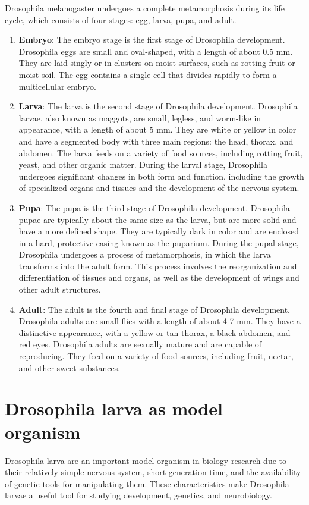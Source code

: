 \documentclass{book}
\begin{document}
	Drosophila melanogaster undergoes a complete metamorphosis during its life cycle, which consists of four stages: egg, larva, pupa, and adult.
	
	\begin{enumerate}
		\item \textbf{Embryo}: The embryo stage is the first stage of Drosophila development. Drosophila eggs are small and oval-shaped, with a length of about 0.5 mm. They are laid singly or in clusters on moist surfaces, such as rotting fruit or moist soil. The egg contains a single cell that divides rapidly to form a multicellular embryo.
		\item \textbf{Larva}: The larva is the second stage of Drosophila development. Drosophila larvae, also known as maggots, are small, legless, and worm-like in appearance, with a length of about 5 mm. They are white or yellow in color and have a segmented body with three main regions: the head, thorax, and abdomen. The larva feeds on a variety of food sources, including rotting fruit, yeast, and other organic matter. During the larval stage, Drosophila undergoes significant changes in both form and function, including the growth of specialized organs and tissues and the development of the nervous system.
		\item \textbf{Pupa}: The pupa is the third stage of Drosophila development. Drosophila pupae are typically about the same size as the larva, but are more solid and have a more defined shape. They are typically dark in color and are enclosed in a hard, protective casing known as the puparium. During the pupal stage, Drosophila undergoes a process of metamorphosis, in which the larva transforms into the adult form. This process involves the reorganization and differentiation of tissues and organs, as well as the development of wings and other adult structures.
		\item \textbf{Adult}: The adult is the fourth and final stage of Drosophila development. Drosophila adults are small flies with a length of about 4-7 mm. They have a distinctive appearance, with a yellow or tan thorax, a black abdomen, and red eyes. Drosophila adults are sexually mature and are capable of reproducing. They feed on a variety of food sources, including fruit, nectar, and other sweet substances.
	\end{enumerate}
	
	\section{Drosophila larva as model organism}
	Drosophila larva are an important model organism in biology research due to their relatively simple nervous system, short generation time, and the availability of genetic tools for manipulating them. These characteristics make Drosophila larvae a useful tool for studying development, genetics, and neurobiology.
	
\end{document}
